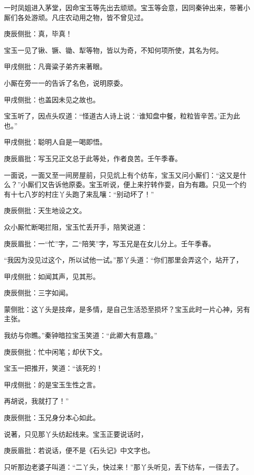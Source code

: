 \begin{parag}
    一时凤姐进入茅堂，因命宝玉等先出去顽顽。宝玉等会意，因同秦钟出来，带著小厮们各处游顽。凡庄农动用之物，皆不曾见过。\begin{note}庚辰侧批：真，毕真！\end{note}宝玉一见了锹、镢、锄、犁等物，皆以为奇，不知何项所使，其名为何。\begin{note}甲戌侧批：凡膏粱子弟齐来著眼。\end{note}小厮在旁一一的告诉了名色，说明原委。\begin{note}甲戌侧批：也盖因未见之故也。\end{note}宝玉听了，因点头叹道：“怪道古人诗上说：‘谁知盘中餐，粒粒皆辛苦。’正为此也。”\begin{note}甲戌侧批：聪明人自是一喝即悟。\end{note}\begin{note}庚辰眉批：写玉兄正文总于此等处，作者良苦。壬午季春。\end{note}一面说，一面又至一间房屋前，只见炕上有个纺车，宝玉又问小厮们：“这又是什么？”小厮们又告诉他原委。宝玉听说，便上来拧转作耍，自为有趣。只见一个约有十七八岁的村庄丫头跑了来乱嚷：“别动坏了！”\begin{note}庚辰侧批：天生地设之文。\end{note}众小厮忙断喝拦阻，宝玉忙丢开手，陪笑说道：\begin{note}庚辰眉批：一“忙”字，二“陪笑”字，写玉兄是在女儿分上。壬午季春。\end{note}“我因为没见过这个，所以试他一试。”那丫头道：“你们那里会弄这个，站开了，\begin{note}甲戌侧批：如闻其声，见其形。\end{note}\begin{note}庚辰侧批：三字如闻。\end{note}\begin{note}蒙侧批：这丫头是技痒，是多情，是自己生活恐至损坏？宝玉此时一片心神，另有主张。\end{note}我纺与你瞧。”秦钟暗拉宝玉笑道：“此卿大有意趣。”\begin{note}庚辰侧批：忙中闲笔；却伏下文。\end{note}宝玉一把推开，笑道：“该死的！\begin{note}甲戌侧批：的是宝玉生性之言。\end{note}再胡说，我就打了！”\begin{note}庚辰侧批：玉兄身分本心如此。\end{note}说著，只见那丫头纺起线来。宝玉正要说话时，\begin{note}庚辰眉批：若说话，便不是《石头记》中文字也。\end{note}只听那边老婆子叫道：“二丫头，快过来！”那丫头听见，丢下纺车，一径去了。
\end{parag}


